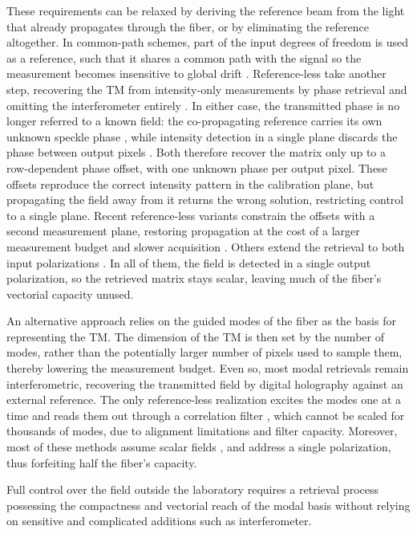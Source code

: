 \documentclass{article}
\begin{document}
These requirements can be relaxed by deriving the reference beam from the light that already propagates through the fiber, or by eliminating the reference altogether. In common-path schemes, part of the input degrees of freedom is used as a reference, such that it shares a common path with the signal so the measurement becomes insensitive to global drift \cite{florentin2018, jakl2022, TM_Gigan, yoon2015}. Reference-less take another step, recovering the TM from intensity-only measurements by phase retrieval and omitting the interferometer entirely \cite{dremeau2015, mode_control, nonconvex_opt}. In either case, the transmitted phase is no longer referred to a known field: the co-propagating reference carries its own unknown speckle phase \cite{jakl2022}, while intensity detection in a single plane discards the phase between output pixels \cite{dremeau2015}. Both therefore recover the matrix only up to a row-dependent phase offset, with one unknown phase per output pixel. These offsets reproduce the correct intensity pattern in the calibration plane, but propagating the field away from it returns the wrong solution, restricting control to a single plane. Recent reference-less variants constrain the offsets with a second measurement plane, restoring propagation at the cost of a larger measurement budget and slower acquisition \cite{zhong2023, retrieving_the_complex_TM}. Others extend the retrieval to both input polarizations \cite{wei2026millisecond}. In all of them, the field is detected in a single output polarization, so the retrieved matrix stays scalar, leaving much of the fiber's vectorial capacity unused.

An alternative approach relies on the guided modes of the fiber as the basis for representing the TM. The dimension of the TM is then set by the number of modes, rather than the potentially larger number of pixels used to sample them, thereby lowering the measurement budget. Even so, most modal retrievals remain interferometric, recovering the transmitted field by digital holography against an external reference\cite{rothe2019, li2021}. The only reference-less realization excites the modes one at a time and reads them out through a correlation filter \cite{bruning2015}, which cannot be scaled for thousands of modes, due to alignment limitations and filter capacity. Moreover, most of these methods assume scalar fields \cite{rothe2019, li2021, bruning2015}, and address a single polarization, thus forfeiting half the fiber's capacity.

Full control over the field outside the laboratory requires a retrieval process possessing the compactness and vectorial reach of the modal basis without relying on sensitive and complicated additions such as interferometer.
\end{document}
